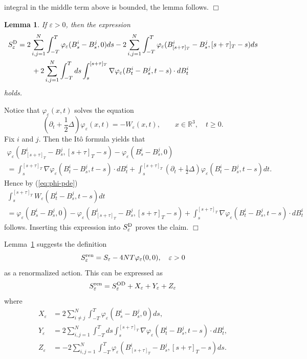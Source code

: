 \documentclass[11pt]{article}
\newtheorem{lemma}[theorem]{Lemma}
\providecommand{\eq}[1]{\begin{equation}\label{#1}}
\providecommand{\en}{\end{equation}}
\providecommand{\qed}{\hfill {$\Box$}\par\medskip}
\providecommand{\BR}{{\mathbb{R}^3 }}
\providecommand{\iijj}{\sum_{i,j=1}^N}
\renewcommand{\ij}{\sum_{i\not=j}^N}
\providecommand{\od}{{\rm OD}}
\providecommand{\dd}{{\rm D}}
\providecommand{\lk}{\left(}
\providecommand{\rk}{\right)}
\providecommand{\non}{\nonumber}
\providecommand{\1}{\mathbb{1}}
\providecommand{\dd}{\mathop{\mathrm{d}}\nolimits}
\providecommand{\eps}{\varepsilon}
\providecommand{\ren}{{\rm ren}}
\begin{document}
integral in the middle term above is bounded, the lemma follows.
\qed
\begin{lemma}
\label{lem:WI-decomp}
If $\eps>0$, then the expression
\begin{align}
S_\eps^{\dd } & = 2\iijj \int_{-T}^T \varphi_\eps(B_s^i-B_s^j,0)ds   - 2\iijj
 \int_{-T}^T \varphi_\eps(B_{[s+\tau]_T}^i-B_s^j,[s+\tau]_T-s) ds \non \\
 & \qquad +  2\iijj  \int_{-T}^T ds \int_{s}^{[s+\tau]_T} \nabla \varphi_\eps(B_t^i -B_s^j,t-s)  \cdot dB_t^i
\label{eq:WI-decomp}
\end{align}
holds.
\end{lemma}
\proof
Notice that $\varphi_\eps(x,t)$ solves the equation
\begin{equation}
\label{eq:phi-pde}
\lk \partial_t  + \frac12 \Delta\rk  \varphi_\eps(x,t) = - W_\eps (x,t), \qquad x \in \BR, \quad t \ge 0.
\end{equation}
Fix $i$ and $j$. Then the  It\^o formula yields that
\begin{multline}
\label{eq:phi-eps-dec}
\varphi_\eps(B_{[s+\tau]_T}^i-B_s^j,[s+\tau]_T-s)-\varphi_\eps(B_s^i-B_s^j,0) \\
= \int_{s}^{[s+\tau]_T} \nabla \varphi_\eps(B_t^i-B_s^j,t-s)  \cdot dB_t^i
+ \int_{s}^{[s+\tau]_T}
\lk \partial_t + \frac{1}{2}\Delta\rk  \varphi_\eps(B_t^i-B_s^j,t-s) dt.
\end{multline}
Hence by (\ref{eq:phi-pde})
\begin{multline}
\label{eq:Wdec}
\int_{s}^{[s+\tau]_T} W_\eps (B_t^i-B_s^j,t-s) dt \\
= \varphi_\eps(B_s^i-B_s^j,0) -\varphi_\eps(B_{[s+\tau]_T}^i-B_s^j,[s+\tau]_T-s) +
\int_{s}^{[s+\tau]_T} \nabla\varphi_\eps(B_t^i-B_s^j,t-s)\cdot dB_t^i
\end{multline}
follows. Inserting this expression into $S_\eps^{\dd}$ proves the claim.
\qed
Lemma~\ref{lem:WI-decomp} suggests the definition
\eq{jozsef def}
S_\eps^\ren  = S_\eps - 4 NT\varphi_\eps(0,0),\quad \eps>0
\en
as a renormalized action. This can be expressed as
\begin{align}
\label{eq:WI-renorm}
S_\eps^\ren
=
S_\eps^{\od }  +X_\eps+Y_\eps+Z_\eps
\end{align}
where
\begin{align}
\label{eq:WI-renorm-1}
X_\eps&
=
2\ij  \int_{-T}^T \varphi_\eps(B_s^i-B_s^j,0) ds, \\
Y_\eps &
= 2 \iijj \int_{-T}^T ds \int_{s}^{[s+\tau]_T} \nabla \varphi_\eps(B_t^i-B_s^j,t-s)  \cdot dB_t^i,\\
\label{eq:WI-renorm-2}
Z_\eps &
= - 2 \iijj \int_{-T}^T \varphi_\eps(B_{[s+\tau]_T}^i-B_s^j,[s+\tau]_T-s)ds.
\end{align}
\end{document}
